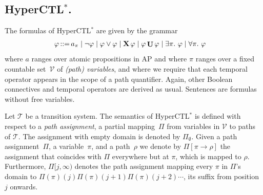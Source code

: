 \documentclass[dvipsnames,10pt,a4paper]{amsart}
\theoremstyle{definition}
\theoremstyle{remark}
\renewcommand{\phi}{\varphi}
\newcommand{\cceq}{\mathop{::=}}
\newcommand{\tsys}{\mathcal{T}}
\DeclareMathOperator{\U}{\mathbf{U}}
\newcommand{\X}{\mathop{\mathbf{X}\vphantom{a}}\nolimits}
\newcommand{\hyctlstar}{{HyperCTL$^*$}\xspace}
\newcommand{\suffix}[2]{#1[#2,\infty)}
\newcommand{\var}{\mathcal{V}}
\newcommand{\ap}[0]{\mathrm{AP}}
\renewcommand{\phi}{\varphi}
\begin{document}
\subsection{\texorpdfstring{\hyctlstar}{HyperCTL*}.}

The formulas of \hyctlstar are given by the grammar
\begin{align*}
\phi & {} \cceq {} a_\pi \mid \neg \phi \mid \phi \vee \phi \mid \X \phi \mid \phi \U \phi \mid \exists \pi.\ \phi \mid \forall \pi.\ \phi
\end{align*}
where $a$ ranges over atomic propositions in $\ap$ and where $\pi$ ranges over a fixed countable set~$\var$ of \emph{(path) variables}, and where we require that each temporal operator appears in the scope of a path quantifier. Again, other Boolean connectives and temporal operators are derived as usual.
Sentences are formulas without free variables.

Let $\tsys$ be a transition system. The semantics of \hyctlstar is defined with respect to a \emph{path assignment}, a partial mapping~$\Pi$ from variables in $\var$ to paths of $\tsys$. The assignment with empty domain is denoted by $\Pi_\emptyset$. Given a path assignment~$\Pi$, a variable~$\pi$, and a path~$\rho$ we denote by $\Pi[\pi \rightarrow \rho]$ the assignment that coincides with $\Pi$ everywhere but at $\pi$, which is mapped to $\rho$. 
Furthermore, $\suffix{\Pi}{j}$ denotes the path assignment mapping every $\pi$ in $\Pi$'s domain to $\Pi(\pi)(j)\Pi(\pi)(j+1)\Pi(\pi)(j+2) \cdots $, its suffix from position $j$ onwards.
\end{document}
